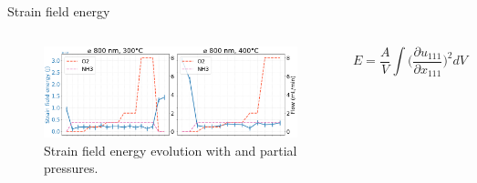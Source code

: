 \begin{frame}{Strain field energy}

    \begin{columns}

        \begin{figure}
            \centering
            \includegraphics[width=\textwidth]{Figures/bcdi_data/D6/strain_energy_D-6.png}
            \hspace{-0.15cm}
            \caption{Strain field energy evolution with \ammonia and \dioxygen partial pressures.}
            \label{fig:SFE}
        \end{figure}

        \begin{flushleft}
        \begin{equation*}
            E = \frac{A}{V} \int \Big( \frac{\partial u_{111}}{\partial x_{111}} \Big)^2dV %
        \end{equation*}
        \end{flushleft}

    \end{columns}
    
\end{frame}


